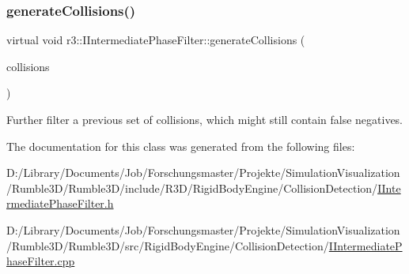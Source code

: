 \subsubsection{\texorpdfstring{generate\+Collisions()}{generateCollisions()}}
{\footnotesize\ttfamily virtual void r3\+::\+I\+Intermediate\+Phase\+Filter\+::generate\+Collisions (\begin{DoxyParamCaption}\item[{\mbox{\hyperlink{classr3_1_1_fixed_size_container}{Fixed\+Size\+Container}}$<$ \mbox{\hyperlink{classr3_1_1_collision_pair}{Collision\+Pair}} $>$ \&}]{collisions }\end{DoxyParamCaption})\hspace{0.3cm}{\ttfamily [pure virtual]}}

Further filter a previous set of collisions, which might still contain false negatives. 

The documentation for this class was generated from the following files\+:\begin{DoxyCompactItemize}
\item 
D\+:/\+Library/\+Documents/\+Job/\+Forschungsmaster/\+Projekte/\+Simulation\+Visualization/\+Rumble3\+D/\+Rumble3\+D/include/\+R3\+D/\+Rigid\+Body\+Engine/\+Collision\+Detection/\mbox{\hyperlink{_i_intermediate_phase_filter_8h}{I\+Intermediate\+Phase\+Filter.\+h}}\item 
D\+:/\+Library/\+Documents/\+Job/\+Forschungsmaster/\+Projekte/\+Simulation\+Visualization/\+Rumble3\+D/\+Rumble3\+D/src/\+Rigid\+Body\+Engine/\+Collision\+Detection/\mbox{\hyperlink{_i_intermediate_phase_filter_8cpp}{I\+Intermediate\+Phase\+Filter.\+cpp}}\end{DoxyCompactItemize}
